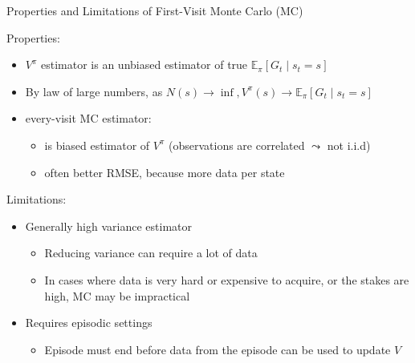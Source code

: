 \documentclass[aspectratio=169]{../latex_main/tntbeamer}  %
\begin{document}


\begin{frame}[c]{Properties and Limitations of First-Visit Monte Carlo (MC)}

Properties:
\begin{itemize}
	\item $V^\pi$ estimator is an unbiased estimator of true $\mathbb{E}_\pi [G_t \mid s_t = s]$
	\item By law of large numbers, as $N(s) \to \inf, V^\pi(s) \to \mathbb{E}_\pi [G_t \mid s_t = s]$
	\item \alert{every}-visit MC estimator:
	\begin{itemize}
		\item is biased estimator of $V^\pi$ (observations are correlated $\leadsto$ not i.i.d)
		\item often better RMSE, because more data per state
	\end{itemize}

\end{itemize}

Limitations:
\begin{itemize}
		\item Generally high variance estimator
		\begin{itemize}
			\item Reducing variance can require a lot of data
			\item In cases where data is very hard or expensive to acquire, or the stakes are
			high, MC may be impractical
		\end{itemize}
		\medskip
		\pause
		\item Requires episodic settings
		\begin{itemize}
			\item Episode must end before data from the episode can be used to update $V$

		\end{itemize}
		
	\end{itemize}
\end{frame}
\end{document}
